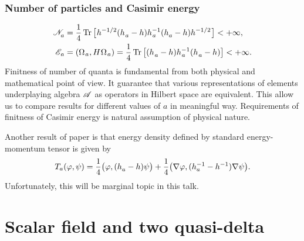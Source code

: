 \documentclass[10pt,t]{beamer}
\begin{document}
\begin{frame}
  \frametitle{Number of particles and Casimir energy}

  \vspace{-2em}


  \begin{align}
    \label{eq:Uklad-quasi-swobodny-w-obecnosci-ETC-21}
    \mathcal{N}_{ a }^{ \vphantom{1} }
    &=
      \frac{ 1 }{ 4 } \operatorname{Tr}\big[ \hspace{0.05em} h^{ -1/2 } (
      h_{ \hspace{0.05em} a }^{ \vphantom{1} } - h )
      h_{ \hspace{0.05em} a }^{ -1 }
      ( h_{ a }^{ \vphantom{1} } - h ) h^{ -1/2 } \hspace{0.07em} \big]
      < +\infty, \\
    \label{eq:Epstein-Glaser-24-A}
    \mathcal{E}_{ \hspace{0.07em} a }
    &=
      ( \Omega_{ \hspace{0.07em} a }, H \hspace{0.05em} \Omega_{ \hspace{0.07em} a } ) =
      \frac{ 1 }{ 4 }
      \operatorname{Tr}\big[ ( h_{ \hspace{0.05em} a }^{ \vphantom{1} } - h )
      h_{ \hspace{0.05em} a }^{ -1 }
      ( h_{ \hspace{0.05em} a }^{ \vphantom{1} } - h ) \big] < +\infty.
  \end{align}
  Finitness of number of quanta is fundamental from both physical and
  mathematical point of view. It guarantee that various representations
  of elements underplaying algebra $\mathcal{A}$ as operators in Hilbert space are
  equivalent. This allow us to compare results for different values of $a$
  in meaningful way. Requirements of finitness of Casimir energy is natural
  assumption of physical nature.

  Another result of paper
  \parencite{Herdegen-Quantum-backreaction-ETC-Part-I-Pub-2005}
  is that energy density defined by standard energy-momentum tensor is
  given by
  \begin{equation}
    \label{eq:Lokalna-gestosc-energii-ETC-06}
    T_{ a }( \varphi, \psi ) =
    \frac{ 1 }{ 4 } \big( \varphi, ( h_{ a }^{ \vphantom{1} } - h ) \psi \big) +
    \frac{ 1 }{ 4 } \big( \nabla \varphi, ( h_{ a }^{ -1 } -
    h^{ -1 }_{ \vphantom{a} } ) \nabla \psi \big).
  \end{equation}
  Unfortunately, this will be marginal topic in this talk.

\end{frame}










\section{Scalar field and two quasi-delta}
\end{document}
